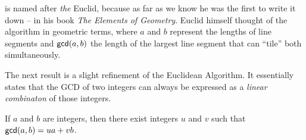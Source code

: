  is named after \emph{the} Euclid, because as far as we know he was the first to write it down -- in his book \emph{The Elements of Geometry}.
Euclid himself thought of the algorithm in geometric terms, where \(a\) and \(b\) represent the lengths of line segments and \(\mathsf{gcd}(a, b)\) the length of the largest line segment that can ``tile'' both simultaneously.

The next result is a slight refinement of the Euclidean Algorithm.
It essentially states that the GCD of two integers can always be expressed as a \emph{linear combinaton} of those integers.

\begin{prop}
If \(a\) and \(b\) are integers, then there exist integers \(u\) and \(v\) such that \(\mathsf{gcd}(a, b) = ua + vb\).
\end{prop}

